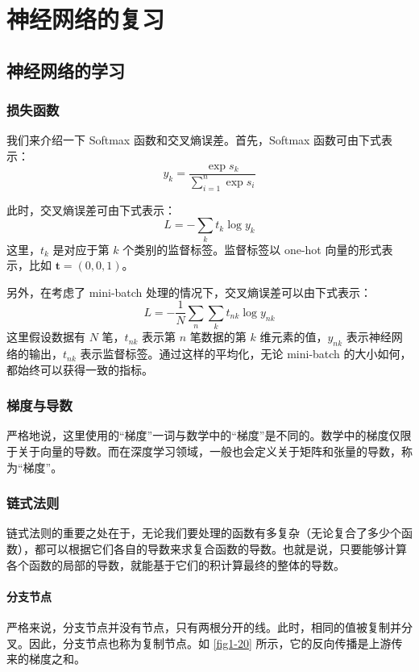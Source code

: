 \chapter{神经网络的复习\label{Ch01}}
\section{神经网络的学习}
\subsection{损失函数}
我们来介绍一下 Softmax 函数和交叉熵误差。首先，Softmax 函数可由下式表示：
\begin{equation}
    y_k=\frac{\exp{s_k}}{\sum_{i=1}^{n}\exp{s_i}}
\end{equation}

此时，交叉熵误差可由下式表示：
\begin{equation}
    L=-\sum_{k}t_k\log{y_k}
\end{equation}
这里，$t_k$ 是对应于第 $k$ 个类别的监督标签。监督标签以 one-hot 向量的形式表示，比如 $\bm{t} = (0, 0, 1)$。

另外，在考虑了 mini-batch 处理的情况下，交叉熵误差可以由下式表示：
\begin{equation}
    L=-\frac{1}{N}\sum_{n}\sum_{k}t_{nk}\log{y_{nk}}
\end{equation}
这里假设数据有 $N$ 笔，$t_{nk}$ 表示第 $n$ 笔数据的第 $k$ 维元素的值，$y_{nk}$ 表示神经网络的输出，$t_{nk}$ 表示监督标签。通过这样的平均化，无论 mini-batch 的大小如何，都始终可以获得一致的指标。
\subsection{梯度与导数}
\begin{tcolorbox}
    严格地说，这里使用的“梯度”一词与数学中的“梯度”是不同的。数学中的梯度仅限于关于向量的导数。而在深度学习领域，一般也会定义关于矩阵和张量的导数，称为“梯度”。
\end{tcolorbox}
\subsection{链式法则}
链式法则的重要之处在于，无论我们要处理的函数有多复杂（无论复合了多少个函数），都可以根据它们各自的导数来求复合函数的导数。也就是说，只要能够计算各个函数的局部的导数，就能基于它们的积计算最终的整体的导数。
\subsubsection*{分支节点}
严格来说，分支节点并没有节点，只有两根分开的线。此时，相同的值被复制并分叉。因此，分支节点也称为复制节点。如 \autoref{fig1-20} 所示，它的反向传播是上游传来的梯度之和。

